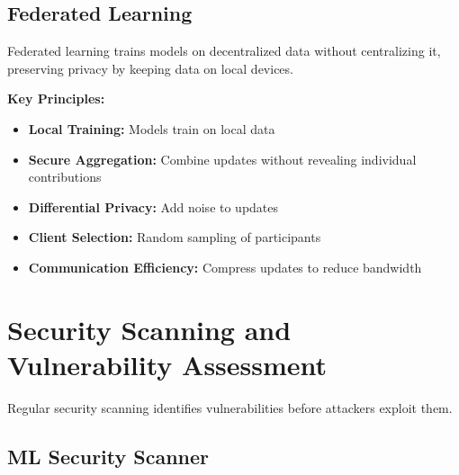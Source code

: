 \subsection{Federated Learning}

Federated learning trains models on decentralized data without centralizing it, preserving privacy by keeping data on local devices.

\textbf{Key Principles:}
\begin{itemize}
    \item \textbf{Local Training:} Models train on local data
    \item \textbf{Secure Aggregation:} Combine updates without revealing individual contributions
    \item \textbf{Differential Privacy:} Add noise to updates
    \item \textbf{Client Selection:} Random sampling of participants
    \item \textbf{Communication Efficiency:} Compress updates to reduce bandwidth
\end{itemize}

\section{Security Scanning and Vulnerability Assessment}

Regular security scanning identifies vulnerabilities before attackers exploit them.

\subsection{ML Security Scanner}

